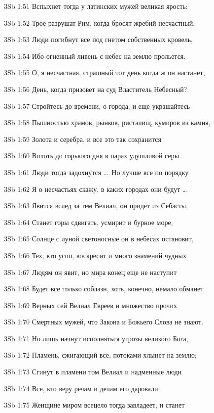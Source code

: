 \vs 3Sb 1:51 Вспыхнет тогда у латинских мужей великая ярость; 

\vs 3Sb 1:52 Трое разрушат Рим, когда бросят жребий несчастный. 

\vs 3Sb 1:53 Люди погибнут все под гнетом собственных кровель, 

\vs 3Sb 1:54 Ибо огненный ливень с небес на землю прольется.

\vs 3Sb 1:55 О, я несчастная, страшный тот день  когда ж он настанет, 

\vs 3Sb 1:56 День, когда призовет на суд Властитель Небесный? 

\vs 3Sb 1:57 Стройтесь до времени, о города, и еще украшайтесь 

\vs 3Sb 1:58 Пышностью храмов, рынков, ристалищ, кумиров из камня, 

\vs 3Sb 1:59 Золота и серебра, и все это так сохранится

\vs 3Sb 1:60 Вплоть до горького дня  в парах удушливой серы 

\vs 3Sb 1:61 Люди тогда задохнутся \ldots\ Но лучше все по порядку 

\vs 3Sb 1:62 Я о несчастьях скажу, в каких городах они будут \ldots

\vs 3Sb 1:63 Явится вслед за тем Велиал, он придет из Себасты, 

\vs 3Sb 1:64 Станет горы сдвигать, усмирит и бурное море, 

\vs 3Sb 1:65 Солнце с луной светоносные он в небесах остановит,

\vs 3Sb 1:66 Тех, кто усоп, воскресит и много знамений чудных 

\vs 3Sb 1:67 Людям он явит, но мира конец еще не наступит  

\vs 3Sb 1:68 Будет все только соблазн, хоть, конечно, немало обманет 

\vs 3Sb 1:69 Верных сей Велиал Евреев и множество прочих

\vs 3Sb 1:70 Смертных мужей, что Закона и Божьего Слова не знают. 

\vs 3Sb 1:71 Но лишь начнут исполняться угрозы великого Бога, 

\vs 3Sb 1:72 Пламень, сжигающий все, потоками хлынет на землю; 

\vs 3Sb 1:73 Сгинут в пламени том Велиал и надменные люди  

\vs 3Sb 1:74 Все, кто веру речам и делам его даровали.

\vs 3Sb 1:75 Женщине миром всецело тогда завладеет, и станет 

